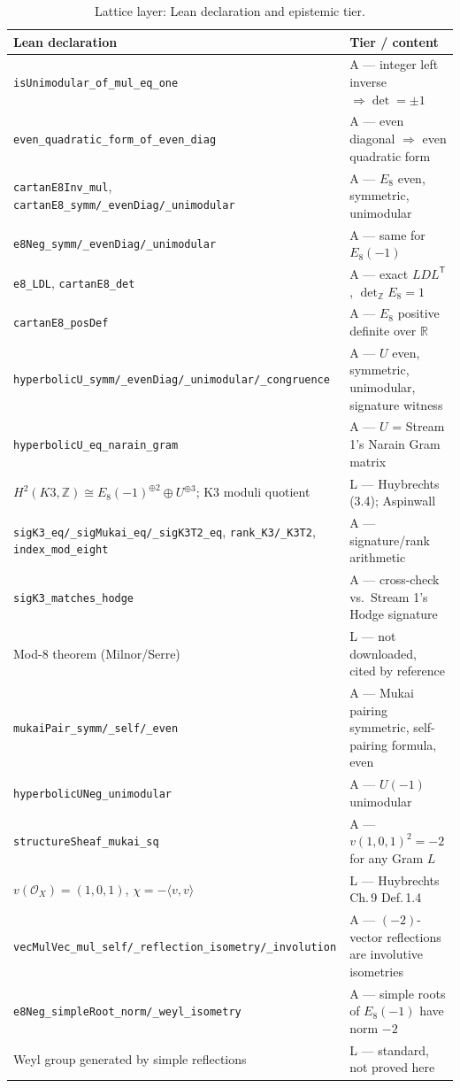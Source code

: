\documentclass[11pt,a4paper]{article}
\theoremstyle{remark}
\begin{document}
\begin{table}[htbp]
\centering\footnotesize
\caption{Lattice layer: Lean declaration and epistemic tier.}
\label{tab:lattices}
\begin{tabular}{@{}l l@{}}
\toprule
\textbf{Lean declaration} & \textbf{Tier / content} \\ \midrule
\texttt{isUnimodular\_of\_mul\_eq\_one} & A --- integer left inverse $\Rightarrow \det=\pm1$ \\
\texttt{even\_quadratic\_form\_of\_even\_diag} & A --- even diagonal $\Rightarrow$ even quadratic form \\
\texttt{cartanE8Inv\_mul}, \texttt{cartanE8\_symm/\_evenDiag/\_unimodular} & A --- $E_8$ even, symmetric, unimodular \\
\texttt{e8Neg\_symm/\_evenDiag/\_unimodular} & A --- same for $E_8(-1)$ \\
\texttt{e8\_LDL}, \texttt{cartanE8\_det} & A --- exact $LDL^{\mathsf T}$, $\det_{\mathbb Z}E_8=1$ \\
\texttt{cartanE8\_posDef} & A --- $E_8$ positive definite over $\mathbb{R}$ \\
\texttt{hyperbolicU\_symm/\_evenDiag/\_unimodular/\_congruence} & A --- $U$ even, symmetric, unimodular, signature witness \\
\texttt{hyperbolicU\_eq\_narain\_gram} & A --- $U$ = Stream 1's Narain Gram matrix \\
$H^2(K3,\mathbb{Z})\cong E_8(-1)^{\oplus2}\oplus U^{\oplus3}$; K3 moduli quotient & L --- Huybrechts (3.4); Aspinwall \\
\texttt{sigK3\_eq/\_sigMukai\_eq/\_sigK3T2\_eq}, \texttt{rank\_K3/\_K3T2}, \texttt{index\_mod\_eight} & A --- signature/rank arithmetic \\
\texttt{sigK3\_matches\_hodge} & A --- cross-check vs.\ Stream 1's Hodge signature \\
Mod-8 theorem (Milnor/Serre) & L --- not downloaded, cited by reference \\
\texttt{mukaiPair\_symm/\_self/\_even} & A --- Mukai pairing symmetric, self-pairing formula, even \\
\texttt{hyperbolicUNeg\_unimodular} & A --- $U(-1)$ unimodular \\
\texttt{structureSheaf\_mukai\_sq} & A --- $v(1,0,1)^2=-2$ for any Gram $L$ \\
$v(\mathcal{O}_X)=(1,0,1)$, $\chi=-\langle v,v\rangle$ & L --- Huybrechts Ch.\,9 Def.\,1.4 \\
\texttt{vecMulVec\_mul\_self/\_reflection\_isometry/\_involution} & A --- $(-2)$-vector reflections are involutive isometries \\
\texttt{e8Neg\_simpleRoot\_norm/\_weyl\_isometry} & A --- simple roots of $E_8(-1)$ have norm $-2$ \\
Weyl group generated by simple reflections & L --- standard, not proved here \\
\bottomrule
\end{tabular}
\end{table}
\end{document}

